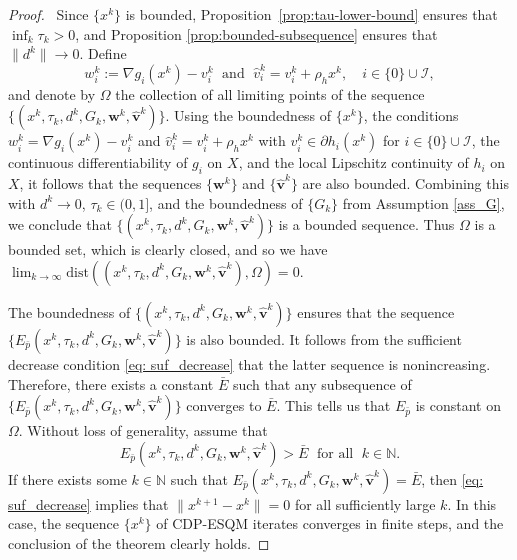 \documentclass[11pt,a4paper]{article}
\def\hat{\widehat}\def\Hat{\widehat}
\theoremstyle{plain}
\begin{document}
\begin{proof}\,
Since $\{x^k\}$ is bounded, Proposition~\ref{prop:tau-lower-bound} ensures that $\inf_{k}\tau_k >0$, and Proposition \ref{prop:bounded-subsequence} ensures that $\|d^k \| \rightarrow 0$. Define
$$
w_i^k := \nabla g_i(x^k) - v_i^k\;\mbox{ and }\;\hat v_i^k=v_i^k + \rho_h x^k,\quad {i \in \{0\} \cup \mathcal I,}
$$
and denote by $\Omega$ the collection of all limiting points of the sequence {$\{(x^k, \tau_k, d^k, G_k, \mathbf{w}^k, \mathbf{\hat{v}}^k)\}$}. Using the boundedness of $\{x^k\}$, the conditions $w_i^k = \nabla g_i(x^k) - v_i^k$ and $\hat v_i^k=v_i^k + \rho_h x^k$ with $v_i^k \in \partial h_i(x^k)$ for {$i \in \{0\}\cup\mathcal I$}, the continuous differentiability of {$g_i$} on $X$, and the local Lipschitz continuity of {$h_i$} on $X$, it follows that the {sequences $\{\mathbf{w}^{k}\}$ and $\{\mathbf{\hat{v}}^{k}\}$} are also bounded. {Combining this with $d^k \to 0$, $\tau_k \in (0,1]$, and the boundedness of $\{G_k\}$ from Assumption \ref{ass_G}, we conclude that $\{(x^k, \tau_k, d^k, G_k, \mathbf{w}^k, \mathbf{\hat{v}}^k)\}$} is a bounded sequence. Thus $\Omega$ is a bounded set, which is clearly closed, and so we have $\lim_{k \rightarrow \infty} \mathrm{dist}({(x^k, \tau_k, d^k, G_k, \mathbf{w}^k, \mathbf{\hat{v}}^k)}, \Omega) = 0$.

The boundedness of {$\{(x^k, \tau_k, d^k, G_k, \mathbf{w}^k, \mathbf{\hat{v}}^k)\}$} ensures that the sequence {$\{E_{\bar p}(x^k, \tau_k, d^k, G_k, \mathbf{w}^k, \allowbreak \mathbf{\hat{v}}^k)\}$} is also bounded. It follows from the sufficient decrease condition \eqref{eq: suf_decrease} that the latter sequence is nonincreasing. Therefore, there exists a constant $\bar{E}$ such that any subsequence of {$\{E_{\bar{p}}(x^k, \tau_k, d^k, G_k, \mathbf{w}^k, \mathbf{\hat{v}}^k)\}$} converges to $\bar{E}$. This tells us that $E_{\bar{p}}$ is constant on $\Omega$.
Without loss of generality, assume that 
$$
{E_{\bar{p}}(x^k, \tau_k, d^k, G_k, \mathbf{w}^k, \mathbf{\hat{v}}^k)} > \bar{E}\;\mbox{ for all }\; k\in\mathbb N.
$$
If there exists some $k\in\mathbb N$ such that ${E_{\bar{p}}(x^k, \tau_k, d^k, G_k, \mathbf{w}^k, \mathbf{\hat{v}}^k)} = \bar{E}$, then \eqref{eq: suf_decrease} implies that {$\|x^{k+1}-x^k\| = 0$} for all sufficiently large $k$. In this case, the sequence $\{x^k\}$ of CDP-ESQM iterates converges {in finite steps}, and the conclusion of the theorem clearly holds.


\end{proof}
\end{document}
